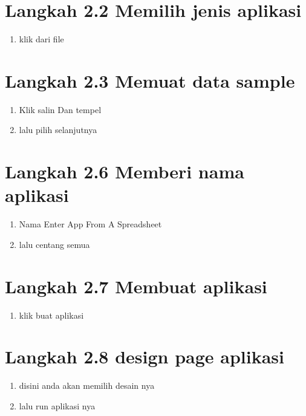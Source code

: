\documentclass{article}
\begin{document}
\section{ Langkah 2.2 Memilih jenis aplikasi}
\begin{enumerate}
    \item klik dari file


\end{enumerate}

\section{ Langkah 2.3 Memuat data sample}
\begin{enumerate}
    \item Klik salin Dan tempel
    \item lalu pilih selanjutnya



\end{enumerate}

\section{ Langkah 2.6 Memberi nama aplikasi}
\begin{enumerate}
    \item Nama Enter App From A Spreadsheet

    \item lalu centang semua



\end{enumerate}

\section{ Langkah 2.7 Membuat aplikasi}
\begin{enumerate}
    \item klik buat aplikasi




\end{enumerate}

\section{ Langkah 2.8 design page aplikasi}
\begin{enumerate}
    \item disini anda akan memilih desain nya
    \item lalu run aplikasi nya

\end{enumerate}
\end{document}
